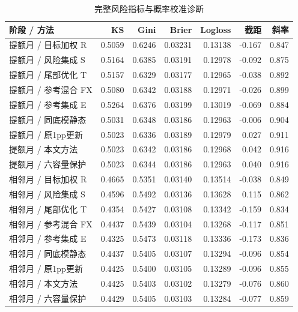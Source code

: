 \begin{table}[H]\centering\caption{完整风险指标与概率校准诊断}
\fontsize{9bp}{12bp}\selectfont
\begin{tabularx}{\linewidth}{@{}Yrrrrrr@{}}\toprule
阶段 / 方法 & KS & Gini & Brier & Logloss & 截距 & 斜率\\\midrule
提额月 / 目标加权 R & 0.5059 & 0.6246 & 0.03231 & 0.13138 & -0.167 & 0.847\\
提额月 / 风险集成 S & 0.5164 & 0.6385 & 0.03191 & 0.12978 & -0.092 & 0.875\\
提额月 / 尾部优化 T & 0.5157 & 0.6329 & 0.03177 & 0.12965 & -0.038 & 0.892\\
提额月 / 参考混合 FX & 0.5080 & 0.6342 & 0.03188 & 0.12971 & -0.026 & 0.899\\
提额月 / 参考集成 E & 0.5264 & 0.6376 & 0.03199 & 0.13019 & -0.069 & 0.884\\
提额月 / 同底模静态 & 0.5031 & 0.6348 & 0.03186 & 0.12963 & -0.006 & 0.904\\
提额月 / 原1pp更新 & 0.5023 & 0.6336 & 0.03189 & 0.12979 & 0.027 & 0.911\\
提额月 / 本文方法 & 0.5023 & 0.6342 & 0.03186 & 0.12968 & 0.042 & 0.916\\
提额月 / 六容量保护 & 0.5023 & 0.6344 & 0.03186 & 0.12963 & 0.040 & 0.916\\
相邻月 / 目标加权 R & 0.4665 & 0.5351 & 0.03140 & 0.13514 & -0.038 & 0.849\\
相邻月 / 风险集成 S & 0.4596 & 0.5492 & 0.03136 & 0.13628 & 0.115 & 0.862\\
相邻月 / 尾部优化 T & 0.4354 & 0.5427 & 0.03108 & 0.13342 & -0.159 & 0.834\\
相邻月 / 参考混合 FX & 0.4437 & 0.5439 & 0.03104 & 0.13268 & -0.117 & 0.851\\
相邻月 / 参考集成 E & 0.4325 & 0.5473 & 0.03118 & 0.13336 & -0.173 & 0.836\\
相邻月 / 同底模静态 & 0.4437 & 0.5405 & 0.03107 & 0.13294 & -0.096 & 0.854\\
相邻月 / 原1pp更新 & 0.4425 & 0.5400 & 0.03105 & 0.13289 & -0.096 & 0.855\\
相邻月 / 本文方法 & 0.4425 & 0.5403 & 0.03102 & 0.13279 & -0.076 & 0.860\\
相邻月 / 六容量保护 & 0.4429 & 0.5405 & 0.03103 & 0.13284 & -0.077 & 0.859\\
\bottomrule\end{tabularx}
\end{table}